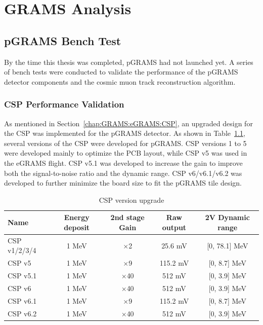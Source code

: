 \chapter{GRAMS Analysis}
\label{chap:GRAMSresult}


\section{pGRAMS Bench Test}
\label{chap:GRAMSresult:pGRAMS}
By the time this thesis was completed, pGRAMS had not launched yet. A series of bench tests were conducted to validate the performance of the pGRAMS detector components and the cosmic muon track reconstruction algorithm. 

\subsection{CSP Performance Validation}
\label{chap:GRAMSresult:pGRAMS:CSP}
As mentioned in Section~\ref{chap:GRAMS:eGRAMS:CSP}, an upgraded design for the \ac{CSP} was implemented for the pGRAMS detector. As shown in Table~\ref{tab:CSP_versions}, several versions of the \ac{CSP} were developed for pGRAMS. \ac{CSP} versions 1 to 5 were developed mainly to optimize the \ac{PCB} layout, while \ac{CSP} v5 was used in the eGRAMS flight. \ac{CSP} v5.1 was developed to increase the gain to improve both the signal-to-noise ratio and the dynamic range. \ac{CSP} v6/v6.1/v6.2 was developed to further minimize the board size to fit the pGRAMS tile design. 

\begin{table}
\centering
\begin{tabular}{l c c c c}
\toprule
\textbf{Name} & \textbf{Energy deposit} & \textbf{2nd stage Gain} & \textbf{Raw output} & \textbf{2V Dynamic range} \\
\midrule
CSP v1/2/3/4 & 1 MeV & $\times$2 & 25.6 mV & [0, 78.1] MeV \\
CSP v5 & 1 MeV & $\times$9 & 115.2 mV & [0, 8.7] MeV\\
CSP v5.1 & 1 MeV & $\times$40 & 512 mV & [0, 3.9] MeV \\
CSP v6 & 1 MeV & $\times$40 & 512 mV & [0, 3.9] MeV \\
CSP v6.1 & 1 MeV & $\times$9 & 115.2 mV & [0, 8.7] MeV \\
CSP v6.2 & 1 MeV & $\times$40 & 512 mV & [0, 3.9] MeV \\
\bottomrule
\end{tabular}
\label{tab:CSP_versions}
\caption{\ac{CSP} version upgrade}
\end{table}

